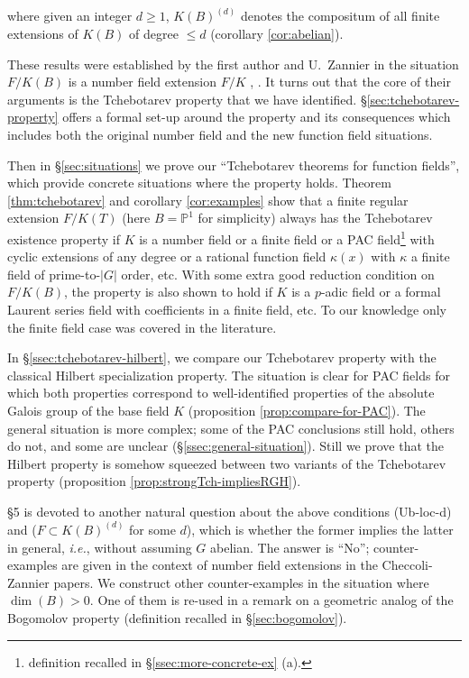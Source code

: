 \documentclass[12pt,english]{amsart}
\newtheorem{twisting lemma}[theorem]{Twisting lemma}
\begin{document}
\noindent 
where given an integer $d\geq 1$, $K(B)^{(d)}$ denotes the compositum of all finite extensions of $K(B)$ of degree $\leq d$ (corollary \ref{cor:abelian}).

These results were established by the first author and U.~Zannier in the situation $F/K(B)$ is a number field extension $F/K$ \cite{ChZa}, \cite{Ch}. 
It turns out that the core of their arguments is the Tchebotarev property that we have identified. \S \ref{sec:tchebotarev-property} offers a formal set-up around the property and its consequences which includes both the original number field and the new function field situations.

Then in \S \ref{sec:situations} we prove our ``Tchebotarev theorems for function fields'', which provide concrete situations where the property holds.
Theorem \ref{thm:tchebotarev} and corollary \ref{cor:examples} show that a finite regular extension $F/K(T)$ (here $B={\mathbb{P}}^1$ for simplicity) always has the Tchebotarev existence property if $K$ is a number field or a finite field or a PAC field\footnote{definition recalled in \S \ref{ssec:more-concrete-ex} (a).} with cyclic extensions of any degree or a rational function field $\kappa(x)$ with $\kappa$ a finite field of prime-to-$|G|$ order, etc. With some extra good reduction condition on $F/K(B)$, the property is also shown to hold if $K$ is a $p$-adic field or a formal 
Laurent series field with coefficients in a finite field, etc. To our knowledge only the finite field case was covered in the literature.

In \S \ref{ssec:tchebotarev-hilbert}, we compare our Tchebotarev property with the classical Hilbert specialization property.
The situation is clear for PAC fields for which both properties correspond to well-identified properties of the absolute Galois group of the base field $K$ (proposition \ref{prop:compare-for-PAC}). The general situation is more complex; some of the PAC conclusions still hold, others do not, and some are unclear (\S \ref{ssec:general-situation}). Still we prove that the Hilbert property is somehow squeezed between two variants of the Tchebotarev property (proposition \ref{prop:strongTch-impliesRGH}).

\S 5 is devoted to another natural question about the above conditions {\rm (Ub-loc-d)} and ($F\subset K(B)^{(d)}$ for some $d$), which is whether the former implies the latter in general, {\it i.e.}, without assuming $G$ abelian. The answer is ``No''; counter-examples are given in the context of number field extensions
in the Checcoli-Zannier papers. We construct other counter-examples in the situation where $\dim(B)>0$. 
One of them is re-used in a remark on a geometric analog of the Bogomolov property (definition recalled in \S \ref{sec:bogomolov}).
\end{document}

